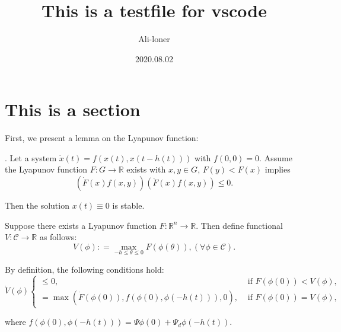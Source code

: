 \documentclass[fontset=windows]{article}
\title{\heiti\zihao{2} This is a testfile for vscode}
\author{\songti Ali-loner}
\date{2020.08.02}
\begin{document}
\maketitle
\thispagestyle{empty}

\begin{abstract}
  \lipsum[2]
\end{abstract}

\tableofcontents

\section{This is a section}



First, we present a lemma on the Lyapunov function:
\begin{lemma}
  \label{lemmaYY}
  . Let a system $\dot{x}(t)=f(x(t), x(t-h\left(t\right)))$ with $f\left(0,0 \right)= 0$. Assume the Lyapunov function $F:G\rightarrow\mathbb{R}$ exists with $x,y\in G$, $F\left(y\right)<F\left(x\right)$ implies
  \begin{equation}
    \left(\dot{F}\left(x\right)f\left(x,y\right)\right)\left(\ddot{F}\left(x\right)f\left(x,y\right)\right)\le0.
  \end{equation}

  Then the solution $x(t)\equiv0$ is stable.
\end{lemma}

Suppose there exists a Lyapunov function $F:\mathbb{R}^n\rightarrow\mathbb{R}$. Then define functional $V:\mathcal{C}\rightarrow\mathbb{R}$ as follows:
\begin{equation}
  V(\phi ): = \mathop {\max }\limits_{ - h \le \theta  \le 0} F(\phi (\theta )),(\forall \phi  \in \mathcal{C}).
  \label{yy1}
\end{equation}

By definition, the following conditions hold:
\begin{equation}
  \dot{V}(\phi)\left\{\begin{array}{cl}
    \leq 0,                                                          & \text { if } F(\phi(0))<V(\phi), \\
    =\max \left(\dot{F}(\phi(0)), f(\phi(0), \phi(-h(t))), 0\right), & \text { if } F(\phi(0))=V(\phi),
  \end{array}\right.
\end{equation}

where $f(\phi(0), \phi(-h(t)))=\Psi\phi(0)+\Psi_d\phi(-h(t))$.
\end{document}
